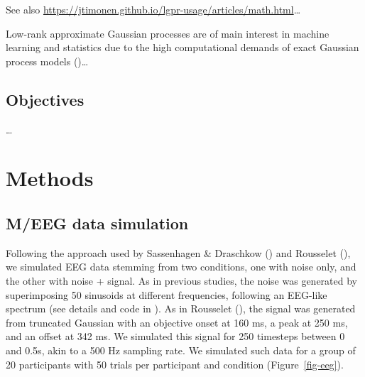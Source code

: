 \documentclass[
  doc,
  floatsintext,
  longtable,
  a4paper,
  nolmodern,
  notxfonts,
  notimes,
  colorlinks=true,linkcolor=blue,citecolor=blue,urlcolor=blue]{apa7}
\begin{document}
See also
\url{https://jtimonen.github.io/lgpr-usage/articles/math.html}\ldots{}

Low-rank approximate Gaussian processes are of main interest in machine
learning and statistics due to the high computational demands of exact
Gaussian process models
()\ldots{}

\subsection{Objectives}\label{objectives}

\ldots{}

\section{Methods}\label{methods}

\subsection{M/EEG data simulation}\label{meeg-data-simulation}

Following the approach used by Sassenhagen \& Draschkow
() and Rousselet
(), we simulated EEG data
stemming from two conditions, one with noise only, and the other with
noise + signal. As in previous studies, the noise was generated by
superimposing 50 sinusoids at different frequencies, following an
EEG-like spectrum (see details and code in
). As in Rousselet
(), the signal was generated
from truncated Gaussian with an objective onset at 160 ms, a peak at 250
ms, and an offset at 342 ms. We simulated this signal for 250 timesteps
between 0 and 0.5s, akin to a 500 Hz sampling rate. We simulated such
data for a group of 20 participants with 50 trials per participant and
condition (Figure~\ref{fig-eeg}).
\end{document}
